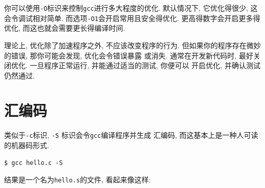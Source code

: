 \documentclass[12pt]{book}
\begin{document}
{%
你可以使用{\tt -O}标识来控制{\tt gcc}进行多大程度的优化.
默认情况下, 它优化得很少, 这会令调试相对简单.
而选项{\tt -O1}会开启常用且安全得优化.
更高得数字会开启更多得优化, 而这也就会需要更长得编译时间.


理论上, 优化除了加速程序之外, 不应该改变程序的行为. 
但如果你的程序存在微妙的错误, 那你可能会发现, 优化会令错误暴露
或消失. 通常在开发新代码时, 最好关闭优化.
一旦程序正常运行, 并能通过适当的测试, 你便可以
开启优化, 并确认测试仍然通过.

\section{汇编码}


类似于{\tt -c}标识, {\tt -S} 标识会令{\tt gcc}编译程序并生成
汇编码, 而这基本上是一种人可读的机器码形式.

\begin{verbatim}
$ gcc hello.c -S
\end{verbatim}
结果是一个名为{\tt hello.s}的文件, 看起来像这样:

}
\end{document}
